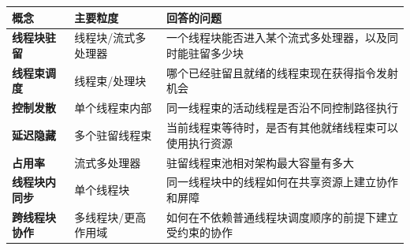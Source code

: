 \begin{center}
\small
\begin{tabularx}{\textwidth}{>{\bfseries}p{} p{} X}
\toprule
概念 & 主要粒度 & 回答的问题 \\
\midrule
线程块驻留 & 线程块/流式多处理器 & 一个线程块能否进入某个流式多处理器，以及同时能驻留多少块 \\
线程束调度 & 线程束/处理块 & 哪个已经驻留且就绪的线程束现在获得指令发射机会 \\
控制发散 & 单个线程束内部 & 同一线程束的活动线程是否沿不同控制路径执行 \\
延迟隐藏 & 多个驻留线程束 & 当前线程束等待时，是否有其他就绪线程束可以使用执行资源 \\
占用率 & 流式多处理器 & 驻留线程束池相对架构最大容量有多大 \\
线程块内同步 & 单个线程块 & 同一线程块中的线程如何在共享资源上建立协作和屏障 \\
跨线程块协作 & 多线程块/更高作用域 & 如何在不依赖普通线程块调度顺序的前提下建立受约束的协作 \\
\bottomrule
\end{tabularx}
\end{center}
